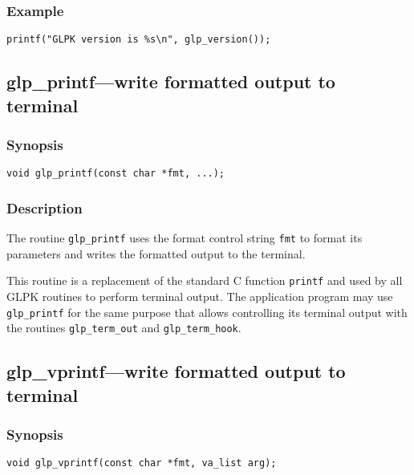 \newpage

\subsubsection*{Example}

\begin{verbatim}
printf("GLPK version is %s\n", glp_version());
\end{verbatim}

\subsection{glp\_printf---write formatted output to terminal}

\subsubsection*{Synopsis}

\begin{verbatim}
void glp_printf(const char *fmt, ...);
\end{verbatim}

\subsubsection*{Description}

The routine \verb|glp_printf| uses the format control string
\verb|fmt| to format its parameters and writes the formatted output to
the terminal.

This routine is a replacement of the standard C function
\verb|printf| and used by all GLPK routines to perform terminal
output. The application program may use \verb|glp_printf| for the same
purpose that allows controlling its terminal output with the routines
\verb|glp_term_out| and \verb|glp_term_hook|.

\subsection{glp\_vprintf---write formatted output to terminal}

\subsubsection*{Synopsis}

\begin{verbatim}
void glp_vprintf(const char *fmt, va_list arg);
\end{verbatim}

